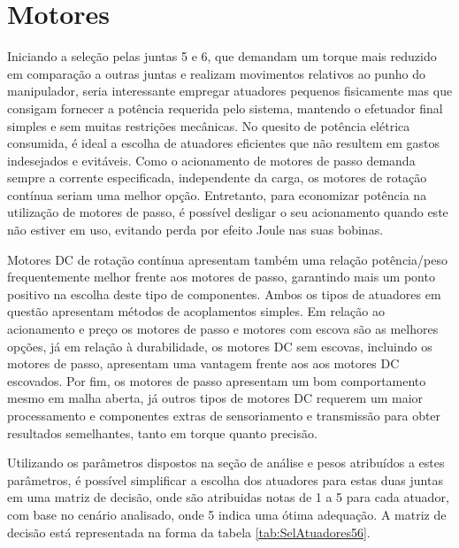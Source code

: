 
\section{Motores}
Iniciando a seleção pelas juntas 5 e 6, que demandam um torque mais 
reduzido em comparação a outras juntas e realizam movimentos relativos ao
punho do manipulador, seria interessante empregar atuadores pequenos 
fisicamente mas que consigam fornecer a potência requerida pelo sistema, 
mantendo o efetuador final simples e sem muitas restrições mecânicas. 
No quesito de potência elétrica consumida, é ideal a escolha de atuadores 
eficientes que não resultem em gastos indesejados e evitáveis. Como o 
acionamento de motores de passo demanda sempre a corrente especificada, 
independente da carga, os motores de rotação contínua seriam uma melhor 
opção. Entretanto, para economizar potência na utilização de motores de 
passo, é possível desligar o seu acionamento quando este não estiver em 
uso, evitando perda por efeito Joule nas suas bobinas. 

Motores DC de rotação contínua apresentam também uma relação potência/peso 
frequentemente melhor frente aos motores de passo, garantindo mais um 
ponto positivo na escolha deste tipo de componentes. 
Ambos os tipos de atuadores em questão apresentam métodos de acoplamentos 
simples. Em relação ao acionamento e preço os motores de passo e motores 
com escova são as melhores opções, já em relação à durabilidade, os 
motores DC sem escovas, incluindo os motores de passo, apresentam uma 
vantagem frente aos aos motores DC escovados. Por fim, os motores de passo 
apresentam um bom comportamento mesmo em malha aberta, já outros tipos de 
motores DC requerem um maior processamento e componentes extras de 
sensoriamento e transmissão para obter resultados semelhantes, tanto em 
torque quanto precisão. 

Utilizando os parâmetros dispostos na seção de análise e pesos atribuídos 
a estes parâmetros, é possível simplificar a escolha dos atuadores para 
estas duas juntas em uma matriz de decisão, onde são atribuidas notas de 
1 a 5 para cada atuador, com base no cenário analisado, onde 5 indica uma 
ótima adequação. 
A matriz de decisão está representada na forma da tabela \ref{tab:SelAtuadores56}.

